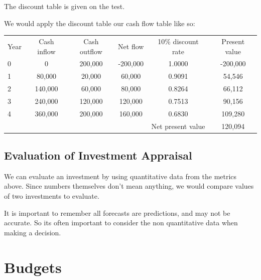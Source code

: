 \documentclass{standalone}
\begin{document}
The discount table is given on the test.

We would apply the discount table our cash flow table like so:
\begin{tabular}{l c c c c c}
    Year               & Cash inflow & Cash outflow & Net flow & 10\% discount rate & Present value \\
    0                  & 0           & 200,000      & -200,000 & 1.0000             & -200,000 \\
    1                  & 80,000      & 20,000       & 60,000   & 0.9091             & 54,546 \\
    2                  & 140,000     & 60,000       & 80,000   & 0.8264             & 66,112 \\
    3                  & 240,000     & 120,000      & 120,000  & 0.7513             & 90,156 \\
    4                  & 360,000     & 200,000      & 160,000  & 0.6830             & 109,280 \\
                       &             &              &          & Net present value  & 120,094
\end{tabular}

\subsection{Evaluation of Investment Appraisal}
We can evaluate an investment by using quantitative data from the metrics above.
Since numbers themselves don't mean anything, we would compare values of two investments to evaluate.

It is important to remember all forecasts are predictions, and may not be accurate.
So its often important to consider the non quantitative data when making a decision.

\section{Budgets}
\end{document}

